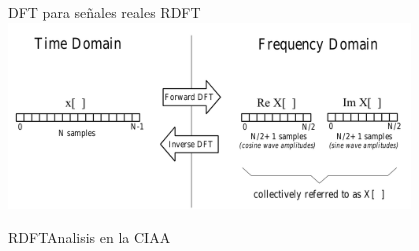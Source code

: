 \begin{frame}{DFT para señales reales RDFT}
   \protoboardicon
   \center\includegraphics[width=0.8\textwidth]{3_clase/real_dft_idft}
   \vfill
\end{frame}
\begin{frame}[c]{RDFT}{Analisis en la CIAA}
   \protoboardicon
   \begin{columns}[c]
      \hspace{2pt}
      \begin{column}{.5\textwidth}
         
      \end{column}
      \hspace{2pt}
      \vrule
      \hspace{2pt}
      \begin{column}{.5\textwidth}
         
      \end{column}
   \end{columns}
   \vfill
\end{frame}
